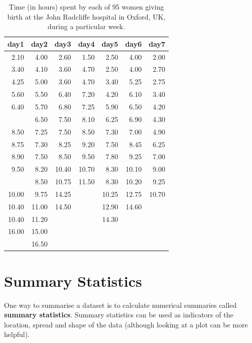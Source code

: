 \documentclass[
  british,
]{book}
\begin{document}
\begin{table}

\caption{\label{tab:taboxbirths}Time (in hours) spent by each of 95 women giving birth at the John 
Radcliffe hospital in Oxford, UK, during a particular week.}
\centering
\begin{tabular}[t]{rrrrrrr}
\toprule
day1 & day2 & day3 & day4 & day5 & day6 & day7\\
\midrule
2.10 & 4.00 & 2.60 & 1.50 & 2.50 & 4.00 & 2.00\\
3.40 & 4.10 & 3.60 & 4.70 & 2.50 & 4.00 & 2.70\\
4.25 & 5.00 & 3.60 & 4.70 & 3.40 & 5.25 & 2.75\\
5.60 & 5.50 & 6.40 & 7.20 & 4.20 & 6.10 & 3.40\\
6.40 & 5.70 & 6.80 & 7.25 & 5.90 & 6.50 & 4.20\\
\addlinespace
7.30 & 6.50 & 7.50 & 8.10 & 6.25 & 6.90 & 4.30\\
8.50 & 7.25 & 7.50 & 8.50 & 7.30 & 7.00 & 4.90\\
8.75 & 7.30 & 8.25 & 9.20 & 7.50 & 8.45 & 6.25\\
8.90 & 7.50 & 8.50 & 9.50 & 7.80 & 9.25 & 7.00\\
9.50 & 8.20 & 10.40 & 10.70 & 8.30 & 10.10 & 9.00\\
\addlinespace
9.75 & 8.50 & 10.75 & 11.50 & 8.30 & 10.20 & 9.25\\
10.00 & 9.75 & 14.25 &  & 10.25 & 12.75 & 10.70\\
10.40 & 11.00 & 14.50 &  & 12.90 & 14.60 & \\
10.40 & 11.20 &  &  & 14.30 &  & \\
16.00 & 15.00 &  &  &  &  & \\
\addlinespace
19.00 & 16.50 &  &  &  &  & \\
\bottomrule
\end{tabular}
\end{table}

\FloatBarrier

\hypertarget{summary-statistics}{%
\section{Summary Statistics}\label{summary-statistics}}

One way to summarise a dataset is to calculate numerical summaries called \textbf{summary statistics}. Summary statistics can be used as indicators of the location, spread and shape of the data (although looking at a plot can be more helpful).
\end{document}
